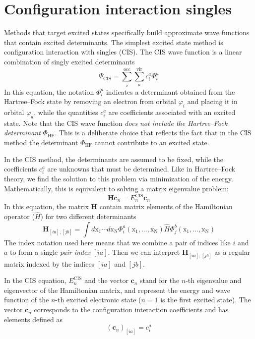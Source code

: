 \documentclass[../Main/notes.tex]{subfiles}
\begin{document}
\section{Configuration interaction singles}
Methods that target excited states specifically build approximate wave functions that contain excited determinants.
The simplest excited state method is configuration interaction with singles (CIS).
The CIS wave function is a linear combination of singly excited determinants
\begin{equation}
\Psi_\mathrm{CIS} = \sum_{i}^{\mathrm{occ}}\sum_{a}^{\mathrm{vir}} c_i^a \Phi_{i}^{a}
\end{equation}
In this equation, the notation $\Phi_{i}^{a}$ indicates a determinant obtained from the Hartree--Fock state by removing an electron from orbital $\varphi_i$ and placing it in orbital $\varphi_a$, while the quantities $c_i^a$ are coefficients associated with an excited state.
Note that the CIS wave function \emph{does not include the Hartree--Fock determinant} $\Phi_\mathrm{HF}$. This is a deliberate choice that reflects the fact that in the CIS method the determinant $\Phi_\mathrm{HF}$ cannot contribute to an excited state.


In the CIS method, the determinants are assumed to be fixed, while the coefficients $c_i^a$ are unknowns that must be determined.
Like in Hartree--Fock theory, we find the solution to this problem via minimization of the energy. Mathematically, this is equivalent to solving a matrix eigenvalue problem:
\begin{equation}
\mathbf{Hc}_n = E_n^\mathrm{CIS} \mathbf{c}_n
\end{equation}
In this equation, the matrix $\mathbf{H}$ contain matrix elements of the Hamiltonian operator ($\hat{H}$) for two different determinants
\begin{equation}
\mathbf{H}_{[ia],[jb]} = \int d\mathrm{x_1} \cdots d\mathrm{x_N}
\Phi_i^a( \mathrm{x_1},\ldots,\mathrm{x_N}) \hat{H} 
\Phi_j^b( \mathrm{x_1},\ldots,\mathrm{x_N})
\end{equation}
The index notation used here means that we combine a pair of indices like $i$ and $a$ to form a single \emph{pair index} $[ia]$. Then we can interpret $\mathbf{H}_{[ia],[jb]}$ as a regular matrix indexed by the indices $[ia]$ and $[jb]$.

In the CIS equation, $E_n^\mathrm{CIS}$ and the vector $\mathbf{c}_n$ stand for the $n$-th eigenvalue and eigenvector of the Hamiltonian matrix, and represent the energy and wave function of the $n$-th excited electronic state ($n = 1$ is the first excited state).
The vector $\mathbf{c}_n$ corresponds to the configuration interaction coefficients and has elements defined as
\begin{equation}
(\mathbf{c}_n)_{[ia]} = c_i^a
\end{equation}
\end{document}
